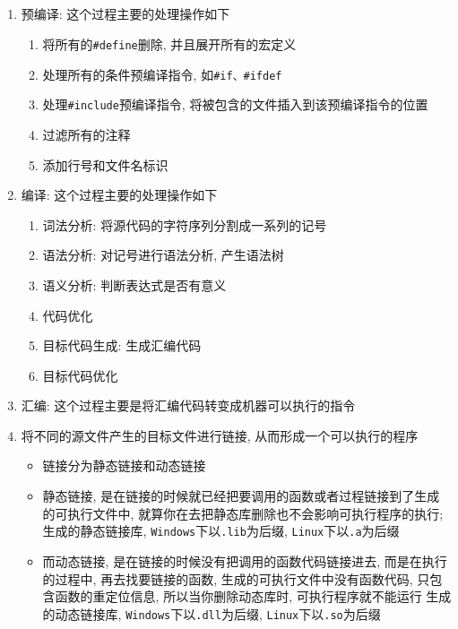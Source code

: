 \subsection[ISOK:{\tt C++}从代码到可执行二进制文件的过程]{}
\begin{enumerate}
	\item 预编译: 这个过程主要的处理操作如下
	\begin{enumerate}
		\item 将所有的{\tt \#define}删除, 并且展开所有的宏定义
		\item 处理所有的条件预编译指令, 如{\tt \#if、\#ifdef}
		\item 处理{\tt \#include}预编译指令, 将被包含的文件插入到该预编译指令的位置
		\item 过滤所有的注释
		\item 添加行号和文件名标识
	\end{enumerate}
	\item 编译: 这个过程主要的处理操作如下
	\begin{enumerate}
		\item 词法分析: 将源代码的字符序列分割成一系列的记号
		\item 语法分析: 对记号进行语法分析, 产生语法树
		\item 语义分析: 判断表达式是否有意义
		\item 代码优化
		\item 目标代码生成: 生成汇编代码
		\item 目标代码优化
	\end{enumerate}
	\item 汇编: 这个过程主要是将汇编代码转变成机器可以执行的指令
	\item 将不同的源文件产生的目标文件进行链接, 从而形成一个可以执行的程序
	\begin{itemize}
		\item 链接分为静态链接和动态链接
		\item 静态链接, 是在链接的时候就已经把要调用的函数或者过程链接到了生成的可执行文件中, 
				就算你在去把静态库删除也不会影响可执行程序的执行; 生成的静态链接库, {\tt Windows}下以{\tt .lib}为后缀, 
				{\tt Linux}下以{\tt .a}为后缀
		\item 而动态链接, 是在链接的时候没有把调用的函数代码链接进去, 而是在执行的过程中, 再去找要链接的函数, 
				生成的可执行文件中没有函数代码, 只包含函数的重定位信息, 所以当你删除动态库时, 可执行程序就不能运行
				生成的动态链接库, {\tt Windows}下以{\tt .dll}为后缀, {\tt Linux}下以{\tt .so}为后缀
	\end{itemize}
\end{enumerate}
